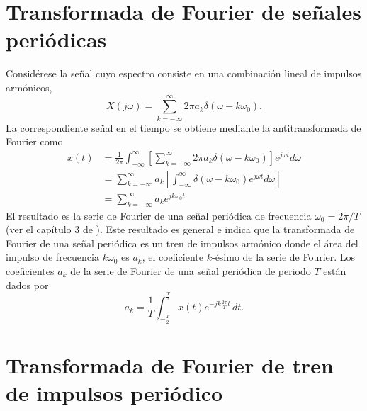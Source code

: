\documentclass[a4paper]{report}
\begin{document}
\section{Transformada de Fourier de señales periódicas}

Considérese la señal cuyo espectro consiste en una combinación lineal de impulsos armónicos,
\begin{equation}\label{eq:continuous_fourier_transform_impulse_train_freq_domain}
X(j\omega)=\sum_{k=-\infty}^{\infty}2\pi a_k\delta(\omega-k\omega_0).
\end{equation}
La correspondiente señal en el tiempo se obtiene mediante la antitransformada de Fourier como
\begin{align*}
x(t)&=\frac{1}{2\pi}\int_{-\infty}^{\infty}\left[\sum_{k=-\infty}^{\infty}2\pi a_k\delta(\omega-k\omega_0)\right]e^{j\omega t}d\omega\\
&=\sum_{k=-\infty}^{\infty} a_k\left[\int_{-\infty}^{\infty}\delta(\omega-k\omega_0)e^{j\omega t}d\omega\right]\\
&=\sum_{k=-\infty}^{\infty} a_ke^{jk\omega_0 t}
\end{align*}
El resultado es la serie de Fourier de una señal periódica de frecuencia \(\omega_0=2\pi/T\) (ver el capítulo 3 de \cite{oppenheim1997signals}). Este resultado es general e indica que la transformada de Fourier de una señal periódica es un tren de impulsos armónico donde el área del impulso de frecuencia \(k\omega_0\) es \(a_k\), el coeficiente \(k\)-ésimo  de la serie de Fourier. Los coeficientes \(a_k\) de la serie de Fourier de una señal periódica de periodo \(T\) están dados por
\begin{equation}\label{eq:fourier_series_coefficients}
 a_k=\frac{1}{T}\int_{-\frac{T}{2}}^{\frac{T}{2}}x(t)e^{-jk\frac{2\pi}{T}t}\,dt. 
\end{equation}

\section{Transformada de Fourier de tren de impulsos periódico}
\end{document}
